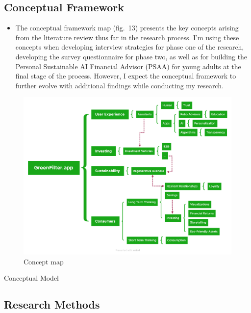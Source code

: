 \documentclass[
  letterpaper,
  DIV=11,
  numbers=noendperiod]{scrartcl}
\providecommand{\tightlist}{%
  \setlength{\itemsep}{0pt}\setlength{\parskip}{0pt}}\usepackage{longtable,booktabs,array}
\begin{document}
\subsection{Conceptual Framework}\label{conceptual-framework}

\begin{itemize}
\tightlist
\item
  The conceptual framework map (fig.~13) presents the key concepts
  arising from the literature review thus far in the research process.
  I'm using these concepts when developing interview strategies for
  phase one of the research, developing the survey questionnaire for
  phase two, as well as for building the Personal Sustainable AI
  Financial Advisor (PSAA) for young adults at the final stage of the
  process. However, I expect the conceptual framework to further evolve
  with additional findings while conducting my research.
\end{itemize}

\begin{figure}[H]

{\centering \includegraphics[width=1\textwidth,height=\textheight]{./images/methodology/concept-map.png}

}

\caption{Concept map}

\end{figure}%

Conceptual Model

\subsection{Research Methods}\label{research-methods}
\end{document}

